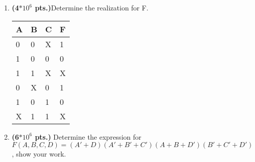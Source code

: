 \documentclass{article}
\begin{document}
\begin{enumerate}
\item {\bf (4$*10^6$ pts.)}Determine the \SOPmin realization for F.


\begin{tabular}{l|l|l||l}
A & B & C & F \\ \hline \hline
0 & 0 & X & 1 \\ \hline
1 & 0 & 0 & 0 \\ \hline
1 & 1 & X & X \\ \hline
0 & X & 0 & 1 \\ \hline
1 & 0 & 1 & 0 \\ \hline
X & 1 & 1 & X \\ 
\end{tabular}


\item {\bf (6$*10^6$ pts.)} Determine the \POSmin expression for \\
$F(A,B,C,D)=(A'+D)(A'+B'+C')(A+B+D')(B'+C'+D')$,
show your work.

\end{enumerate}
\end{document}
